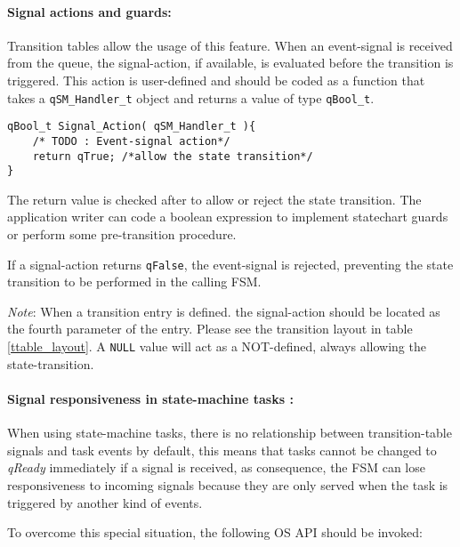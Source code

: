 \paragraph{Signal actions and guards:} Transition tables allow the usage of this feature. When an event-signal is received from the queue, the signal-action, if available, is evaluated before the transition is triggered. This action is user-defined and should be coded as a function that takes a \lstinline{qSM_Handler_t} object and returns a value of type \lstinline{qBool_t}. 
\medskip

\begin{lstlisting}[style=CStyle]
qBool_t Signal_Action( qSM_Handler_t ){
    /* TODO : Event-signal action*/
    return qTrue; /*allow the state transition*/
}
\end{lstlisting}

The return value is checked after to allow or reject the state transition. The application writer can code a boolean expression to implement statechart guards or perform some pre-transition procedure.

\begin{tcolorbox}
\HandRight If a signal-action returns \lstinline{qFalse}, the event-signal is rejected, preventing the state transition to be performed in the calling FSM.
\end{tcolorbox}

\begin{tcolorbox}
\ArrowBoldDownRight \textit{Note}: When a transition entry is defined. the signal-action should be located as the fourth parameter of the entry. Please see the transition layout in table \ref{ttable_layout}.
A \lstinline{NULL} value will act as a NOT-defined, always allowing the state-transition. 
\end{tcolorbox}

\paragraph{Signal responsiveness in state-machine tasks :}

When using state-machine tasks, there is no relationship between transition-table signals and task events by default, this means that tasks cannot be changed to \textit{qReady} immediately if a signal is received, as consequence, the FSM can lose responsiveness to incoming signals because they are only served when the task is triggered by another kind of events. 

To overcome this special situation, the following OS API should be invoked:
\medskip

